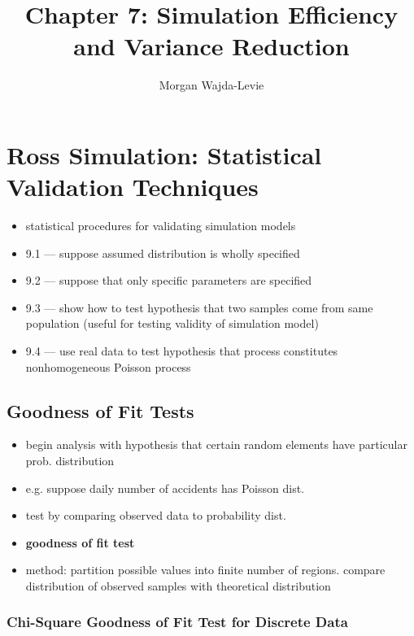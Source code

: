 \documentclass{article}
\title{Chapter 7: Simulation Efficiency and Variance Reduction}
\author{Morgan Wajda-Levie}
\begin{document}
\maketitle

\setcounter{section}{8}
\section{Ross Simulation: Statistical Validation Techniques}

\begin{itemize}
    \item statistical procedures for validating simulation models
    \item 9.1 --- suppose assumed distribution is wholly specified
    \item 9.2 --- suppose that only specific parameters are specified
    \item 9.3 --- show how to test hypothesis that two samples come from
        same population (useful for testing validity of simulation model)
    \item 9.4 --- use real data to test hypothesis that process
        constitutes nonhomogeneous Poisson process
\end{itemize}

\subsection{Goodness of Fit Tests}

\begin{itemize}
    \item begin analysis with hypothesis that certain random elements
        have particular prob. distribution
    \item e.g. suppose daily number of accidents has Poisson dist.
    \item test by comparing observed data to probability dist.
    \item \textbf{goodness of fit test}
    \item method: partition possible values into finite number of
        regions. compare distribution of observed samples with
        theoretical distribution
\end{itemize}

\subsubsection*{Chi-Square Goodness of Fit Test for Discrete Data}
\end{document}
